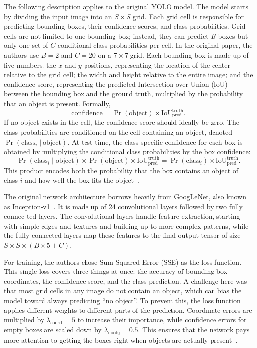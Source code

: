\documentclass[a4paper,12pt]{report}
\begin{document}
The following description applies to the original YOLO model. The model starts by dividing the
input image into an $S \times S$ grid. Each grid cell is responsible for predicting bounding boxes,
their confidence scores, and class probabilities. Grid cells are not limited to one bounding box;
instead, they can predict $B$ boxes but only one set of $C$ conditional class probabilities per
cell. In the original paper, the authors use $B=2$ and $C=20$ on a $7 \times 7$ grid. Each bounding
box is made up of five numbers: the $x$ and $y$ positions, representing the location of the center
relative to the grid cell; the width and height relative to the entire image; and the confidence
score, representing the predicted Intersection over Union (IoU) between the bounding box and the
ground truth, multiplied by the probability that an object is present. Formally,
\begin{equation}
\text{confidence} = \Pr(\text{object}) \times \text{IoU}_{\text{pred}}^{\text{truth}}.
\end{equation}
If no object exists in the cell, the confidence score should ideally be zero. The class
probabilities are conditioned on the cell containing an object, denoted
$\Pr(\text{class}_i \mid \text{object})$. At test time, the class-specific confidence for each box
is obtained by multiplying the conditional class probabilities by the box confidence:
\begin{equation}
\Pr(\text{class}_i \mid \text{object}) \times \Pr(\text{object}) \times
\text{IoU}_{\text{pred}}^{\text{truth}} =
\Pr(\text{class}_i) \times \text{IoU}_{\text{pred}}^{\text{truth}}.
\end{equation}
This product encodes both the probability that the box contains an object of class $i$ and how well
the box fits the object~\parencite{yolo}.

The original network architecture borrows heavily from GoogLeNet, also known as
Inception-v1~\parencite{yolo}. It is made up of 24 convolutional layers followed by two fully connec
ted
layers. The convolutional layers handle feature extraction, starting with simple edges and textures
and building up to more complex patterns, while the fully connected layers map these features to
the final output tensor of size $S \times S \times (B \times 5 + C)$.

For training, the authors chose Sum-Squared Error (SSE) as the loss function. This single loss
covers three things at once: the accuracy of bounding box coordinates, the confidence score, and
the class prediction. A challenge here was that most grid cells in any image do not contain an
object, which can bias the model toward always predicting ``no object''. To prevent this, the loss
function applies different weights to different parts of the prediction. Coordinate errors are
multiplied by $\lambda_{\text{coord}} = 5$ to increase their importance, while confidence errors
for empty boxes are scaled down by $\lambda_{\text{noobj}} = 0.5$. This ensures that the network
pays more attention to getting the boxes right when objects are actually present~\parencite{yolo}.
\end{document}
